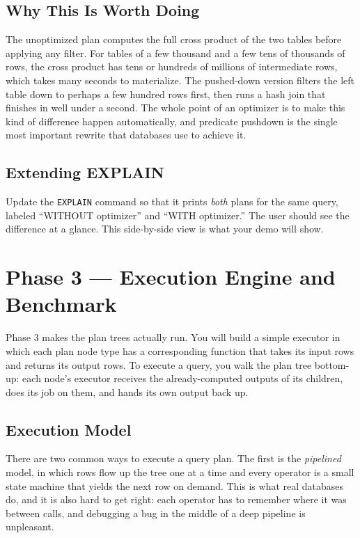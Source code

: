 \documentclass[11pt,a4paper]{article}
\begin{document}
\subsection{Why This Is Worth Doing}
The unoptimized plan computes the full cross product of the two tables before applying any filter. For tables of a few thousand and a few tens of thousands of rows, the cross product has tens or hundreds of millions of intermediate rows, which takes many seconds to materialize. The pushed-down version filters the left table down to perhaps a few hundred rows first, then runs a hash join that finishes in well under a second. The whole point of an optimizer is to make this kind of difference happen automatically, and predicate pushdown is the single most important rewrite that databases use to achieve it.

\subsection{Extending EXPLAIN}
Update the \texttt{EXPLAIN} command so that it prints \textit{both} plans for the same query, labeled ``WITHOUT optimizer'' and ``WITH optimizer.'' The user should see the difference at a glance. This side-by-side view is what your demo will show.

\section{Phase 3 --- Execution Engine and Benchmark}

Phase 3 makes the plan trees actually run. You will build a simple executor in which each plan node type has a corresponding function that takes its input rows and returns its output rows. To execute a query, you walk the plan tree bottom-up: each node's executor receives the already-computed outputs of its children, does its job on them, and hands its own output back up.

\subsection{Execution Model}
There are two common ways to execute a query plan. The first is the \textit{pipelined} model, in which rows flow up the tree one at a time and every operator is a small state machine that yields the next row on demand. This is what real databases do, and it is also hard to get right: each operator has to remember where it was between calls, and debugging a bug in the middle of a deep pipeline is unpleasant.
\end{document}
